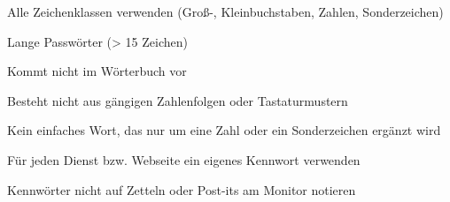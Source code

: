 \item Alle Zeichenklassen verwenden (Groß-, Kleinbuchstaben, Zahlen, Sonderzeichen)
\item Lange Passwörter (> 15 Zeichen)
\item Kommt nicht im Wörterbuch vor
\item Besteht nicht aus gängigen Zahlenfolgen oder Tastaturmustern
\item Kein einfaches Wort, das nur um eine Zahl oder ein Sonderzeichen ergänzt wird
\item Für jeden Dienst bzw. Webseite ein eigenes Kennwort verwenden
\item Kennwörter nicht auf Zetteln oder Post-its am Monitor notieren
